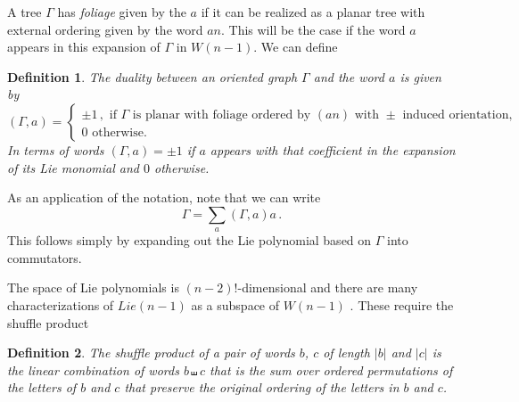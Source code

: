 \documentclass[11pt]{article}
\newcommand{\1}{{\rm 1\hskip-0.25em I}}
\newtheorem{defn}{Definition}[section]
\begin{document}
A tree $\Gamma$ has  \emph{foliage}  given by the  $a$ if it can be realized as a planar tree with external ordering given by the word $an$.  This will be the case if the word $a$  appears in this expansion of $\Gamma$ in $W(n-1)$. We can define
\begin{defn}
The duality between an oriented graph $\Gamma$  and the word $a$ is given by
\begin{equation}
(\Gamma,a)=\begin{cases} \pm1\, , \mbox{ if $\Gamma$ is  planar  with foliage ordered by $(an)$ with $\pm$ induced orientation},\\
 0 \mbox{ otherwise.}\end{cases}
\end{equation}
In terms of words  $(\Gamma,a)=\pm 1$ if $a$ appears with that coefficient in the expansion of its Lie monomial and $0$ otherwise.
\end{defn}
As an application of the notation, note that we can write
\begin{equation}
\Gamma=\sum_a  (\Gamma,a)a \, .\label{gamma-a}
\end{equation}
This follows simply  by expanding out the Lie polynomial based on $\Gamma$ into commutators.


The space of Lie polynomials is $(n-2)!$-dimensional and there are many characterizations of $Lie(n-1)$ as a subspace of $W(n-1)$ \cite{Reutenauer}.  These require the shuffle product

\begin{defn}
The \emph{shuffle product} of a pair of words $b$, $c$ of length $|b|$ and $|c|$  is the  linear combination of words $b\shuffle c$ that is the sum over ordered permutations of the letters of $b$ and $c$ that preserve the original ordering of the letters in $b$ and  $c$. 
\end{defn} 
\end{document}
